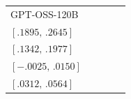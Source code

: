 \begin{tabular*}{\linewidth}{@{\extracolsep{\fill}}lcccc@{}}
GPT-OSS-120B & \begin{tabular}[t]{@{}c@{}}\(.2262\)\\[-1pt]\([.1895,\,.2645]\)\end{tabular} & \begin{tabular}[t]{@{}c@{}}\(.1654\)\\[-1pt]\([.1342,\,.1977]\)\end{tabular} & \begin{tabular}[t]{@{}c@{}}\(.0061\)\\[-1pt]\([-.0025,\,.0150]\)\end{tabular} & \begin{tabular}[t]{@{}c@{}}\(.0436\)\\[-1pt]\([.0312,\,.0564]\)\end{tabular}\\[0.5pt]
\bottomrule
\end{tabular*}
\endgroup
